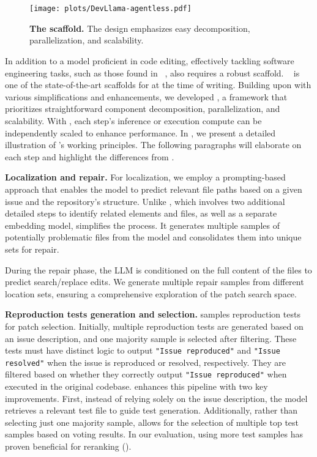 \section{\ouragentless}
\label{sec:apd:agentlessmini}

\begin{figure}[htbp]
\centering
\texttt{[image: plots/DevLlama-agentless.pdf]}
\caption{\textbf{The \ouragentless scaffold.} The design emphasizes easy decomposition, parallelization, and scalability.}
\label{fig:agentless-mini}
\end{figure}

In addition to a model proficient in code editing, effectively tackling software engineering tasks, such as those found in \swebench{}~\cite{swebench}, also requires a robust scaffold.
\agentless~\cite{agentless} is one of the state-of-the-art scaffolds for \swebench{} at the time of writing.
Building upon \agentless with various simplifications and enhancements, we developed \ouragentless, a framework that prioritizes straightforward component decomposition, parallelization, and scalability.
With \ouragentless, each step's inference or execution compute can be independently scaled to enhance \swebench performance.
In , we present a detailed illustration of \ouragentless's working principles. The following paragraphs will elaborate on each step and highlight the differences from \agentless.

\textbf{Localization and repair.}
For localization, we employ a prompting-based approach that enables the model to predict relevant file paths based on a given issue and the repository's structure.
Unlike \agentless, which involves two additional detailed steps to identify related elements and files, as well as a separate embedding model, \ouragentless simplifies the process. It generates multiple samples of potentially problematic files from the model and consolidates them into unique sets for repair.

During the repair phase, the LLM is conditioned on the full content of the files to predict search/replace edits. We generate multiple repair samples from different location sets, ensuring a comprehensive exploration of the patch search space.


\textbf{Reproduction tests generation and selection.}
\agentless samples reproduction tests for patch selection. Initially, multiple reproduction tests are generated based on an issue description, and one majority sample is selected after filtering. These tests must have distinct logic to output \texttt{"Issue reproduced"} and \texttt{"Issue resolved"} when the issue is reproduced or resolved, respectively. They are filtered based on whether they correctly output \texttt{"Issue reproduced"} when executed in the original codebase.
\ouragentless enhances this pipeline with two key improvements. First, instead of relying solely on the issue description, the model retrieves a relevant test file to guide test generation.
Additionally, rather than selecting just one majority sample, \ouragentless allows for the selection of multiple top test samples based on voting results. In our evaluation, using more test samples has proven beneficial for reranking ().

